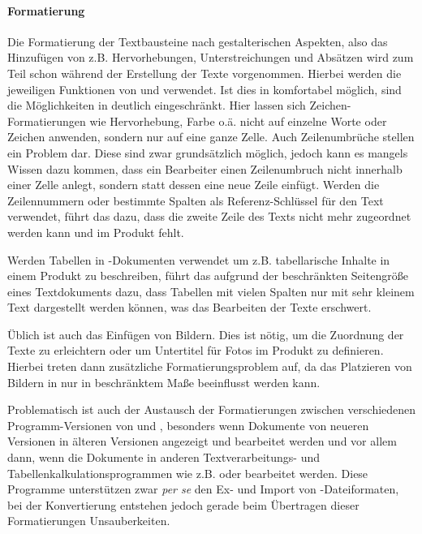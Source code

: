 \paragraph{Formatierung} Die Formatierung der Textbausteine nach gestalterischen Aspekten, also das Hinzufügen von z.B. Hervorhebungen, Unterstreichungen und Absätzen wird zum Teil schon während der Erstellung der Texte vorgenommen. Hierbei werden die jeweiligen Funktionen von  und  verwendet. Ist dies in  komfortabel möglich, sind die Möglichkeiten in  deutlich eingeschränkt. Hier lassen sich Zeichen-Formatierungen wie Hervorhebung, Farbe o.ä. nicht auf einzelne Worte oder Zeichen anwenden, sondern nur auf eine ganze Zelle. Auch Zeilenumbrüche stellen ein Problem dar. Diese sind zwar grundsätzlich möglich, jedoch kann es mangels Wissen dazu kommen, dass ein Bearbeiter einen Zeilenumbruch nicht innerhalb einer Zelle anlegt, sondern statt dessen eine neue Zeile einfügt. Werden die Zeilennummern oder bestimmte Spalten als Referenz-Schlüssel für den Text verwendet, führt das dazu, dass die zweite Zeile des Texts nicht mehr zugeordnet werden kann und im Produkt fehlt. 

Werden Tabellen in -Dokumenten verwendet um z.B. tabellarische Inhalte in einem Produkt zu beschreiben, führt das aufgrund der beschränkten Seitengröße eines Textdokuments dazu, dass Tabellen mit vielen Spalten nur mit sehr kleinem Text dargestellt werden können, was das Bearbeiten der Texte erschwert. 

Üblich ist auch das Einfügen von Bildern. Dies ist nötig, um die Zuordnung der Texte zu erleichtern oder um Untertitel für Fotos im Produkt zu definieren. Hierbei treten dann zusätzliche Formatierungsproblem auf, da das Platzieren von Bildern in  nur in beschränktem Maße beeinflusst werden kann. 

Problematisch ist auch der Austausch der Formatierungen zwischen verschiedenen Programm-Versionen von  und , besonders wenn Dokumente von neueren Versionen in älteren Versionen angezeigt und bearbeitet werden und vor allem dann, wenn die Dokumente in anderen Textverarbeitungs- und Tabellenkalkulationsprogrammen wie z.B.   oder  bearbeitet werden. Diese Programme unterstützen zwar \emph{per se} den Ex- und Import von -Dateiformaten, bei der Konvertierung entstehen jedoch gerade beim Übertragen dieser Formatierungen Unsauberkeiten. 

